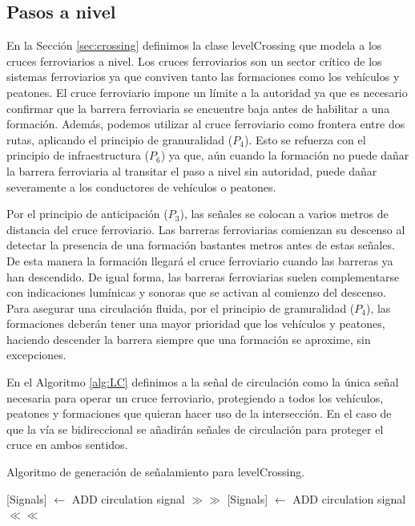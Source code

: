 \subsection{Pasos a nivel}

    
    En la Sección \ref{sec:crossing} definimos la clase levelCrossing que modela a los cruces ferroviarios a nivel. Los cruces ferroviarios son un sector crítico de los sistemas ferroviarios ya que conviven tanto las formaciones como los vehículos y peatones. El cruce ferroviario impone un límite a la autoridad ya que es necesario confirmar que la barrera ferroviaria se encuentre baja antes de habilitar a una formación. Además, podemos utilizar al cruce ferroviario como frontera entre dos rutas, aplicando el principio de granuralidad ($P_4$). Esto se refuerza con el principio de infraestructura ($P_6$) ya que, aún cuando la formación no puede dañar la barrera ferroviaria al transitar el paso a nivel sin autoridad, puede dañar severamente a los conductores de vehículos o peatones.

    Por el principio de anticipación ($P_3$), las señales se colocan a varios metros de distancia del cruce ferroviario. Las barreras ferroviarias comienzan su descenso al detectar la presencia de una formación bastantes metros antes de estas señales. De esta manera la formación llegará el cruce ferroviario cuando las barreras ya han descendido. De igual forma, las barreras ferroviarias suelen complementarse con indicaciones lumínicas y sonoras que se activan al comienzo del descenso. Para asegurar una circulación fluida, por el principio de granuralidad ($P_4$), las formaciones deberán tener una mayor prioridad que los vehículos y peatones, haciendo descender la barrera siempre que una formación se aproxime, sin excepciones.

    En el Algoritmo \ref{alg:LC} definimos a la señal de circulación como la única señal necesaria para operar un cruce ferroviario, protegiendo a todos los vehículos, peatones y formaciones que quieran hacer uso de la intersección. En el caso de que la vía se bidireccional se añadirán señales de circulación para proteger el cruce en ambos sentidos.

    \begin{algorithm}[hbt!]
        \caption{Algoritmo de generación de señalamiento para levelCrossing.}\label{alg:LC}
        \DontPrintSemicolon
        \SetNoFillComment
        \LinesNotNumbered 
        {
            [Signals] $\gets$ ADD circulation signal $\gg\gg$\;
            [Signals] $\gets$ ADD circulation signal $\ll\ll$\;
        }
        \KwResult{[Signals]} 
    \end{algorithm}    
    
